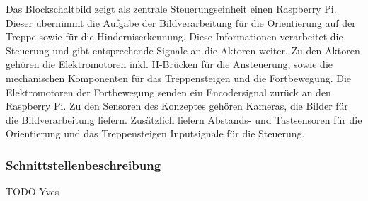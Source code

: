  Das Blockschaltbild zeigt als zentrale Steuerungseinheit einen Raspberry Pi. Dieser übernimmt die Aufgabe der Bildverarbeitung für die Orientierung auf der Treppe sowie für die Hinderniserkennung. Diese Informationen verarbeitet die Steuerung und gibt entsprechende Signale an die Aktoren weiter. Zu den Aktoren gehören die Elektromotoren inkl. H-Brücken für die Ansteuerung, sowie die mechanischen Komponenten für das Treppensteigen und die Fortbewegung. Die Elektromotoren der Fortbewegung senden ein Encodersignal zurück an den Raspberry Pi. Zu den Sensoren des Konzeptes gehören Kameras, die Bilder für die Bildverarbeitung liefern. Zusätzlich liefern Abstands- und Tastsensoren für die Orientierung und das Treppensteigen Inputsignale für die Steuerung.
 
 \subsubsection{Schnittstellenbeschreibung}
TODO Yves